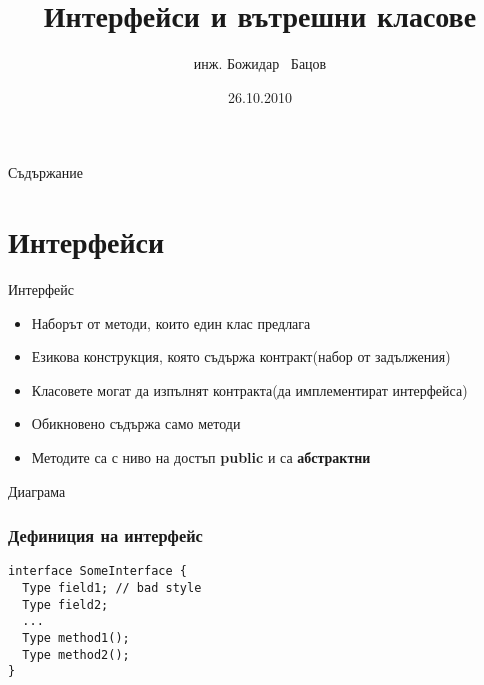 \documentclass{beamer}
\title{Интерфейси и вътрешни класове}
\author{инж. Божидар ~Бацов}
\institute{Drow Ltd.}
\date{26.10.2010}
\begin{document}
\begin{frame}
  \titlepage
\end{frame}

\begin{frame}{Съдържание}
  \tableofcontents
\end{frame}




\section{Интерфейси}

\begin{frame}{Интерфейс}
  \begin{itemize}
  \item
    Наборът от методи, които един клас предлага
  \item
    Езикова конструкция, която съдържа контракт(набор
    от задължения)
  \item Класовете могат да изпълнят контракта(да имплементират
    интерфейса)
  \item Обикновено съдържа само методи
  \item Методите са с ниво на достъп \textbf{public} и са \textbf{абстрактни}

  \end{itemize}
\end{frame}


\begin{frame}{Диаграма}
  \transdissolve
  
\end{frame}

\begin{frame}[fragile]
  \frametitle{Дефиниция на интерфейс}
  \transdissolve
\begin{lstlisting}
interface SomeInterface {
  Type field1; // bad style
  Type field2;
  ...
  Type method1();
  Type method2();
}
\end{lstlisting}
\end{frame}
\end{document}
